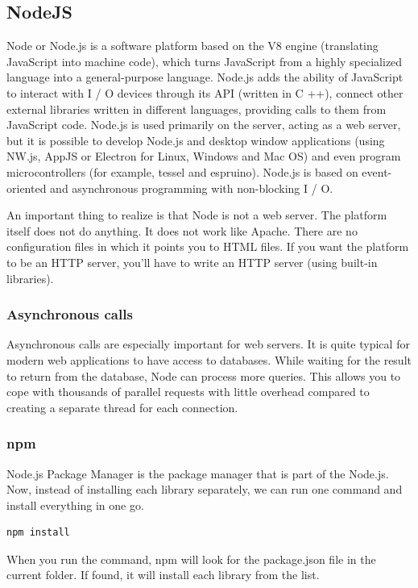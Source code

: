 \subsection{NodeJS}
Node or Node.js is a software platform based on the V8 engine (translating JavaScript into machine code), which turns JavaScript from a highly specialized language into a general-purpose language. Node.js adds the ability of JavaScript to interact with I / O devices through its API (written in C ++), connect other external libraries written in different languages, providing calls to them from JavaScript code. Node.js is used primarily on the server, acting as a web server, but it is possible to develop Node.js and desktop window applications (using NW.js, AppJS or Electron for Linux, Windows and Mac OS) and even program microcontrollers (for example, tessel and espruino). Node.js is based on event-oriented and asynchronous programming with non-blocking I / O. \par 
An important thing to realize is that Node is not a web server. The platform itself does not do anything. It does not work like Apache. There are no configuration files in which it points you to HTML files. If you want the platform to be an HTTP server, you'll have to write an HTTP server (using built-in libraries).
\cite{NodeJS}

\subsubsection{Asynchronous calls}
Asynchronous calls are especially important for web servers. It is quite typical for modern web applications to have access to databases. While waiting for the result to return from the database, Node can process more queries. This allows you to cope with thousands of parallel requests with little overhead compared to creating a separate thread for each connection. \cite{NodeJS}

\subsubsection{npm}
Node.js Package Manager is the package manager that is part of the Node.js.
Now, instead of installing each library separately, we can run one command and install everything in one go.

\begin{verbatim}
npm install
\end{verbatim}

When you run the command, npm will look for the package.json file in the current folder. If found, it will install each library from the list. \cite{NodeJS}

